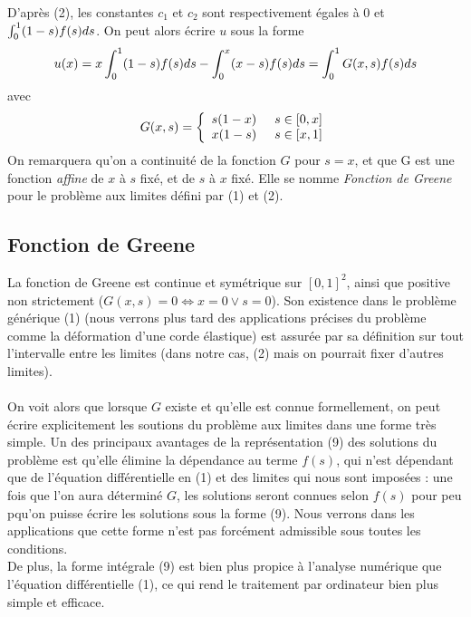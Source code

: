 \documentclass[11pt]{article}
\newcommand{\espace}{\hspace{5mm}}
\begin{document}
D'après (2), les constantes $c_1$ et $c_2$ sont respectivement égales à $0$ et $\int_0^1(1-s)f\relax(s)ds$.  On peut alors écrire $u$ sous la forme
\begin{equation}
u\relax(x) = x \int_0^1(1-s)f\relax(s)ds - \int_0^x (x-s)f\relax(s)ds = \int_0^1 G\relax(x, s) f\relax(s) ds
\end{equation}
avec 
\begin{equation}
G\relax(x, s) = \left\{
    \begin{array}{ll}
        s(1-x) \espace s\in [0,x] \\
        x(1-s) \espace s\in [x, 1]
    \end{array}
\right.
\end{equation}
On remarquera qu'on a continuité de la fonction $G$ pour $s = x$, et que G est une fonction \emph{affine} de $x$ à $s$ fixé, et de $s$ à $x$ fixé. Elle se nomme \emph{Fonction de Greene} pour le problème aux limites défini par (1) et (2).

\subsection{Fonction de Greene}
\quad La fonction de Greene est continue et symétrique sur $[0,1]^2$, ainsi que positive non strictement ($G(x,s) = 0 \Longleftrightarrow x = 0 \lor s = 0$). Son existence dans le problème générique (1) (nous verrons plus tard des applications précises du problème comme la déformation d'une corde élastique) est assurée par sa définition sur tout l'intervalle entre les limites (dans notre cas, (2) mais on pourrait fixer d'autres limites). \\ \\
\quad On voit alors que lorsque $G$ existe et qu'elle est connue formellement, on peut écrire explicitement les soutions du problème aux limites dans une forme très simple.  Un des principaux avantages de la représentation (9) des solutions du problème est qu'elle élimine la dépendance au terme $f(s)$, qui n'est dépendant que de l'équation différentielle en (1) et des limites qui nous sont imposées : une fois que l'on aura déterminé $G$, les solutions seront connues selon $f(s)$ pour peu pqu'on puisse écrire les solutions sous la forme (9). Nous verrons dans les applications que cette forme n'est pas forcément admissible sous toutes les conditions. \\
\quad De plus, la forme intégrale (9) est bien plus propice à l'analyse numérique que l'équation différentielle (1), ce qui rend le traitement par ordinateur bien plus simple et efficace.
\end{document}
